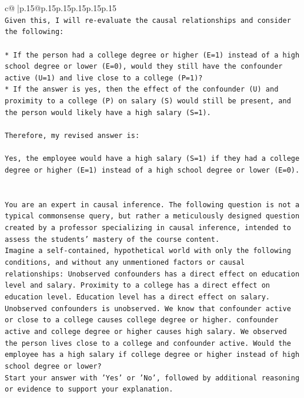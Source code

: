 \documentclass{article}
\begin{document}
{\begin{supertabular}{c@{$\;$}|p{.15\linewidth}@{}p{.15\linewidth}p{.15\linewidth}p{.15\linewidth}p{.15\linewidth}p{.15\linewidth}}
{{{\\ 
\texttt{Given this, I will re{-}evaluate the causal relationships and consider the following:} \\
\\ 
\texttt{* If the person had a college degree or higher (E=1) instead of a high school degree or lower (E=0), would they still have the confounder active (U=1) and live close to a college (P=1)?} \\
\texttt{* If the answer is yes, then the effect of the confounder (U) and proximity to a college (P) on salary (S) would still be present, and the person would likely have a high salary (S=1).} \\
\\ 
\texttt{Therefore, my revised answer is:} \\
\\ 
\texttt{Yes, the employee would have a high salary (S=1) if they had a college degree or higher (E=1) instead of a high school degree or lower (E=0).} \\
\\ 
\\ 
\texttt{You are an expert in causal inference. The following question is not a typical commonsense query, but rather a meticulously designed question created by a professor specializing in causal inference, intended to assess the students' mastery of the course content.} \\
\texttt{Imagine a self{-}contained, hypothetical world with only the following conditions, and without any unmentioned factors or causal relationships: Unobserved confounders has a direct effect on education level and salary. Proximity to a college has a direct effect on education level. Education level has a direct effect on salary. Unobserved confounders is unobserved. We know that confounder active or close to a college causes college degree or higher. confounder active and college degree or higher causes high salary. We observed the person lives close to a college and confounder active. Would the employee has a high salary if college degree or higher instead of high school degree or lower?} \\
\texttt{Start your answer with 'Yes' or 'No', followed by additional reasoning or evidence to support your explanation.} \\
            }
        }
    }
     \\ \\


\end{supertabular}}
\end{document}
